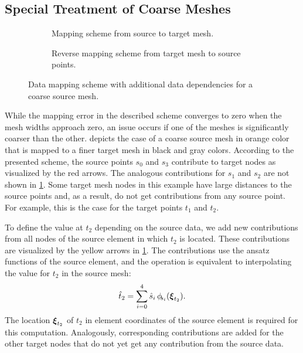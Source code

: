 \subsection{Special Treatment of Coarse Meshes}

\begin{figure}%
  \centering%
  \begin{subfigure}{0.4\textwidth}
    \centering
    \def\svgwidth{\textwidth}
    \caption{Mapping scheme from source to target mesh.}%
    \label{fig:mapping_between_meshes_5}%
  \end{subfigure}
  \quad
  \begin{subfigure}{0.4\textwidth}
    \centering
    \def\svgwidth{\textwidth}
    \caption{Reverse mapping scheme from target mesh to source points.}%
    \label{fig:mapping_between_meshes_6}%
  \end{subfigure}
  \caption{Data mapping scheme with additional data dependencies for a coarse source mesh.}%
  \label{fig:mapping_between_meshes_56}%
\end{figure}%

While the mapping error in the described scheme converges to zero when the mesh widths approach zero, an issue occurs if one of the meshes is significantly coarser than the other.  depicts the case of a coarse source mesh in orange color that is mapped to a finer target mesh in black and gray colors. According to the presented scheme, the source points $s_0$ and $s_3$ contribute to target nodes as visualized by the red arrows. The analogous contributions for $s_1$ and $s_2$ are not shown in \cref{fig:mapping_between_meshes_5}. Some target mesh nodes in this example have large distances to the source points and, as a result, do not get contributions from any source point. For example, this is the case for the target points $t_1$ and $t_2$.

To define the value at $t_2$ depending on the source data, we add new contributions from all nodes of the source element in which $t_2$ is located. These contributions are visualized by the yellow arrows in \cref{fig:mapping_between_meshes_5}.
The contributions use the ansatz functions of the source element, and the operation is equivalent to interpolating the value for $t_2$ in the source mesh:
\begin{align*}
  \hat{t}_2 = \s{i=0}{4}\hat{s}_i\,\phi_{\noexpand\mkern-4mu s_i}(\bfxi_{t_2}).
\end{align*}
The location $\boldsymbol{\xi}_{t_2}$ of $t_2$ in element coordinates of the source element is required for this computation. Analogously, corresponding contributions are added for the other target nodes that do not yet get any contribution from the source data.

